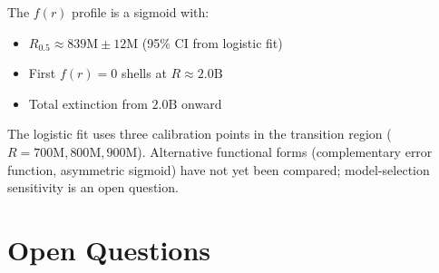 \documentclass[11pt,a4paper]{article}
\newcommand{\fr}{f(r)}
\newcommand{\Rhalf}{R_{0.5}}
\theoremstyle{definition}
\theoremstyle{plain}
\theoremstyle{remark}
\begin{document}
The $\fr$ profile is a sigmoid with:
\begin{itemize}
  \item $\Rhalf \approx 839\text{M} \pm 12\text{M}$ (95\% CI from logistic fit)
  \item First $\fr = 0$ shells at $R \approx 2.0\text{B}$
  \item Total extinction from $2.0\text{B}$ onward
\end{itemize}

The logistic fit uses three calibration points in the transition region ($R = 700\text{M}, 800\text{M}, 900\text{M}$).  Alternative functional forms (complementary error function, asymmetric sigmoid) have not yet been compared; model-selection sensitivity is an open question.


\section{Open Questions}\label{sec:open}
\end{document}
